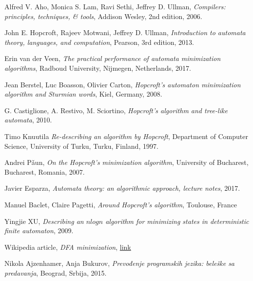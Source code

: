 \documentclass[a4paper]{article}
\begin{document}
\begin{thebibliography}{9}

  Alfred V. Aho,
  Monica S. Lam,
  Ravi Sethi,
  Jeffrey D. Ullman,
  \textit{Compilers: principles, techniques, \& tools},
  Addison Wesley,
  2nd edition,
  2006.

  John E. Hopcroft,
  Rajeev Motwani,
  Jeffrey D. Ullman,
  \textit{Introduction to automata theory, languages, and computation},
  Pearson,
  3rd edition,
  2013.
  
  Erin van der Veen,
  \textit{The practical performance of automata minimization algorithms},
  Radboud University,
  Nijmegen, Netherlands,
  2017.
  
  Jean Berstel,
  Luc Boasson,
  Olivier Carton,
  \textit{Hopcroft's automaton minimization algorithm and Sturmian words},
  Kiel, Germany,
  2008.
  
  G. Castiglione,
  A. Restivo,
  M. Sciortino,
  \textit{Hopcroft's algorithm and tree-like automata},
  2010.
  
  Timo Knuutila
  \textit{Re-describing an algorithm by Hopcroft},
  Department of Computer Science,
  University of Turku,
  Turku, Finland,
  1997.
  
  Andrei P\v aun,
  \textit{On the Hopcroft's minimization algorithm},
  University of Bucharest,
  Bucharest, Romania,
  2007.
  
  Javier Esparza,
  \textit{Automata theory: an algorithmic approach, lecture notes},
  2017.
  
  Manuel Baclet,
  Claire Pagetti,
  \textit{Around Hopcroft's algorithm},
  Toulouse, France
  
  Yingjie XU,
  \textit{Describing an $n log n$ algorithm for minimizing states in deterministic finite automaton},
  2009.
  
  Wikipedia article,
  \textit{DFA minimization},
  \href{https://en.wikipedia.org/wiki/DFA_minimization}{link}

  Nikola Ajzenhamer, 
  Anja Bukurov,
  \textit{Prevođenje programskih jezika: beleške sa predavanja},
  Beograd, Srbija,
  2015.

\end{thebibliography}
\end{document}
